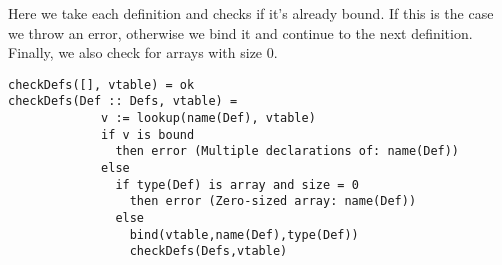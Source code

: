 Here we take each definition and checks if it's already bound.
If this is the case we throw an error, otherwise we bind it and
continue to the next definition. Finally, we also check for arrays
with size 0.

\begin{verbatim}
checkDefs([], vtable) = ok
checkDefs(Def :: Defs, vtable) =
             v := lookup(name(Def), vtable)
             if v is bound
               then error (Multiple declarations of: name(Def))
             else
               if type(Def) is array and size = 0
                 then error (Zero-sized array: name(Def))
               else
                 bind(vtable,name(Def),type(Def))
                 checkDefs(Defs,vtable)
\end{verbatim}

